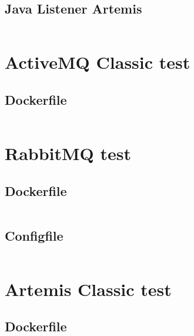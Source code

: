 \subsection{Java Listener Artemis}\label{sec:listener_artemis}
\inputminted{java}{../tests/listener/artemis-listener/demo/src/main/java/com/example/ArtemisSocketBridge.java}

\section{ActiveMQ Classic test}\label{sec:code_amq}

\subsection{Dockerfile}\label{sec:docker_amq}
\inputminted{python3}{../tests/messaging/activemq-server/Dockerfile}

\section{RabbitMQ test}\label{sec:code_rabbitmq}

\subsection{Dockerfile}\label{sec:docker_rabbitmq}
\inputminted{python3}{../tests/messaging/rabbitmq-server/Dockerfile}

\subsection{Configfile}\label{sec:config_rabbitmq}
\inputminted{python3}{../tests/messaging/rabbitmq-server/rabbitmq.conf}

\section{Artemis Classic test}\label{sec:code_artemis}

\subsection{Dockerfile}\label{sec:docker_artemis}
\inputminted{python3}{../tests/messaging/artemis-server/Dockerfile}

